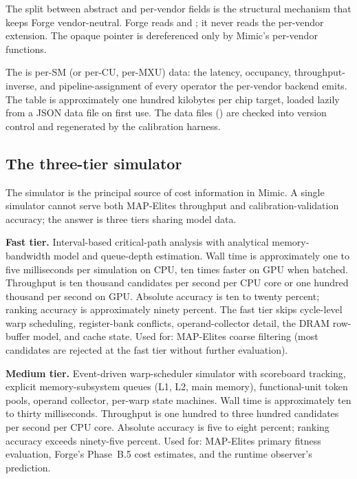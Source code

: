 The split between abstract and per-vendor fields is the structural mechanism that keeps Forge vendor-neutral.
Forge reads  and ; it never reads the per-vendor extension.
The opaque pointer is dereferenced only by Mimic's per-vendor functions.

The  is per-SM (or per-CU, per-MXU) data: the latency, occupancy, throughput-inverse, and pipeline-assignment of every operator the per-vendor backend emits.
The table is approximately one hundred kilobytes per chip target, loaded lazily from a JSON data file on first use.
The data files () are checked into version control and regenerated by the calibration harness.

\subsection{The three-tier simulator}
\label{sec:mimic-simulator}

The simulator is the principal source of cost information in Mimic.
A single simulator cannot serve both MAP-Elites throughput and calibration-validation accuracy; the answer is three tiers sharing model data.

\textbf{Fast tier.}
Interval-based critical-path analysis with analytical memory-bandwidth model and queue-depth estimation.
Wall time is approximately one to five milliseconds per simulation on CPU, ten times faster on GPU when batched.
Throughput is ten thousand candidates per second per CPU core or one hundred thousand per second on GPU.
Absolute accuracy is ten to twenty percent; ranking accuracy is approximately ninety percent.
The fast tier skips cycle-level warp scheduling, register-bank conflicts, operand-collector detail, the DRAM row-buffer model, and cache state.
Used for: MAP-Elites coarse filtering (most candidates are rejected at the fast tier without further evaluation).

\textbf{Medium tier.}
Event-driven warp-scheduler simulator with scoreboard tracking, explicit memory-subsystem queues (L1, L2, main memory), functional-unit token pools, operand collector, per-warp state machines.
Wall time is approximately ten to thirty milliseconds.
Throughput is one hundred to three hundred candidates per second per CPU core.
Absolute accuracy is five to eight percent; ranking accuracy exceeds ninety-five percent.
Used for: MAP-Elites primary fitness evaluation, Forge's Phase~B.5 cost estimates, and the runtime observer's prediction.

